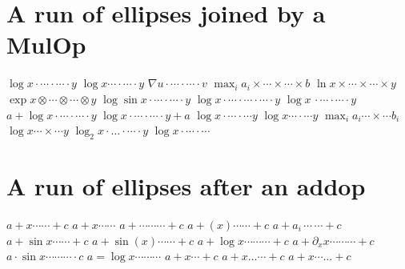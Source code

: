 \documentclass{article}
\begin{document}
\section{A run of ellipses joined by a MulOp}
$\log x\cdot\cdots\cdot\cdots\cdot y$ $\log x\cdots\cdot\cdots\cdot y$ $\nabla u\cdot\cdots\cdot\cdots\cdot v$
$\max_i a_i\times\cdots\times\cdots\times b$ $\ln x\times\cdots\times\cdots\times y$ $\exp x\otimes\cdots\otimes\cdots\otimes y$
$\log\sin x\cdot\cdots\cdot\cdots\cdot y$ $\log x\cdot\cdots\cdot\cdots\cdot\cdots\cdot y$ $\log x\,\cdot\cdots\cdot\cdots\cdot y$
$a+\log x\cdot\cdots\cdot\cdots\cdot y$ $\log x\cdot\cdots\cdot\cdots\cdot y+a$ $\log x\cdot\cdots\cdot\cdots y$ $\log x\cdots\cdot\cdots y$
$\max_i a_i\cdots\times\cdots b_i$ $\log x\cdots\times\cdots y$ $\log_2 x\cdot\ldots\cdot\cdots\cdot y$ $\log x\cdot\cdots\cdot\cdots$

\section{A run of ellipses after an addop}
$a+x\cdots\cdots+c$ $a+x\cdots\cdots$ $a+\cdots\cdots\cdots+c$ $a+(x)\cdots\cdots+c$ $a+a_i\,\cdots\,\cdots+c$
$a+\sin x\cdots\cdots+c$ $a+\sin(x)\cdots\cdots+c$ $a+\log x\cdots\cdots\cdots+c$ $a+\partial_x x\cdots\cdots\cdots+c$
$a\cdot\sin x\cdots\cdots\cdots\cdot c$ $a=\log x\cdots\cdots\cdots$ $a+x\cdots+c$ $a+x\ldots\cdots+c$ $a+x\cdots\ldots+c$

\end{document}
